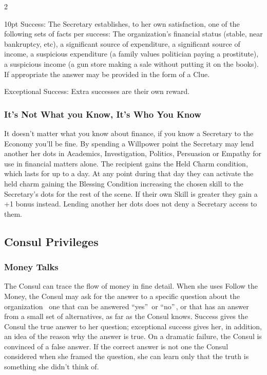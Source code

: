 \begin{multicols}{2}
\begin{myindentpar}{10pt}
    Success: The Secretary establishes, to her own satisfaction, one of the following sets of facts per success: The organization's financial status (stable, near bankruptcy, etc), a significant source of expenditure, a significant source of income, a suspicious expenditure (a family values politician paying a prostitute), a suspicious income (a gun store making a sale without putting it on the books). If appropriate the answer may be provided in the form of a Clue. 
    
    Exceptional Success: Extra successes are their own reward. \end{myindentpar}

\subsubsection*{It's Not What you Know, It's Who You Know}

It doesn’t matter what you know about finance, if you know a Secretary to the Economy you'll be fine. By spending a Willpower point the Secretary may lend another her dots in Academics, Investigation, Politics, Persuasion or Empathy for use in financial matters alone. The recipient gains the Held Charm condition, which lasts for up to a day. At any point during that day they can activate the held charm gaining the Blessing Condition increasing the chosen skill to the Secretary's dots for the rest of the scene. If their own Skill is greater they gain a +1 bonus instead. Lending another her dots does not deny a Secretary access to them. 

\subsection*{Consul Privileges}

\subsubsection*{Money Talks}

The Consul can trace the flow of money in fine detail. When she uses Follow the Money, the Consul may ask for the answer to a specific question about the organization \textendash\, one that can be answered \textquotedblleft yes\textquotedblright\, or \textquotedblleft no\textquotedblright\,, or that has an answer from a small set of alternatives, as far as the Consul knows. Success gives the Consul the true answer to her question; exceptional success gives her, in addition, an idea of the reason why the answer is true. On a dramatic failure, the Consul is convinced of a false answer. If the correct answer is not one the Consul considered when she framed the question, she can learn only that the truth is something she didn't think of. 


\end{multicols}
